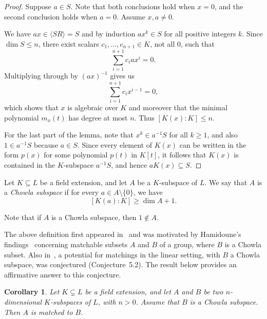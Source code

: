 \documentclass[11pt]{amsart}
\newtheorem{corollary}[theorem]{Corollary}
\theoremstyle{definition}
\theoremstyle{remark}
\begin{document}
\begin{proof}
Suppose \( a \in S \). Note that both conclusions hold when \( x = 0 \), and the second conclusion holds when \( a = 0 \). Assume \( x, a \neq 0 \).  

We have \( ax \in \langle SR \rangle = S \) and by induction \( ax^k \in S \) for all positive integers \( k \). Since \( \dim S \leq n \), there exist scalars \( c_1, \ldots , c_{n+1} \in K \), not all \( 0 \), such that 
\[
\sum_{i=1}^{n+1}c_iax^i = 0.
\]
Multiplying through by \( (ax)^{-1} \) gives us
\[
\sum_{i=1}^{n+1}c_ix^{i-1} = 0,
\]
which shows that \( x \) is algebraic over \( K \) and moreover that the minimal polynomial \( m_x(t) \) has degree at most \( n \). Thus \( [K(x):K] \leq n \). 

For the last part of the lemma, note that \( x^k \in a^{-1}S \) for all \( k \geq 1 \), and also \(1 \in a^{-1} S \) because \( a \in S \).  Since every element of \( K(x) \) can be written in the form \( p(x) \) for some polynomial \( p(t) \) in \( K[t] \), it follows that \( K(x) \) is contained in the \( K \)-subspace \( a^{-1}S \), and hence \( aK(x) \subseteq S \). 
\end{proof}


Let \( K \subseteq L \) be a field extension, and let \( A \) be a \( K \)-subspace of \( L \). We say that \( A \) is a \emph{Chowla subspace} if for every \( a \in A \setminus \{0\} \), we have
\[
[K(a) : K] \geq \dim A + 1.
\]

Note that if \( A \) is a Chowla subspace, then \( 1 \notin A \).

The above definition first appeared in~\cite{Aliabadi 2} and was motivated by Hamidoune’s findings~\cite{Hamidoune} concerning matchable subsets \( A \) and \( B \) of a group, where \( B \) is a Chowla subset. Also in~\cite{Aliabadi 2}, a potential for matchings in the linear setting, with \( B \) a Chowla subspace, was conjectured (Conjecture~5.2). The result below provides an affirmative answer to this conjecture.


\begin{corollary}\label{linear Chowla}
    Let \( K \subsetneq L \) be a field extension, and let \( A \) and \( B \) be two \( n \)-dimensional \( K \)-subspaces of \( L \), with \( n > 0 \). Assume that \( B \) is a Chowla subspace. Then \( A \) is matched to \( B \).
\end{corollary}
\end{document}
